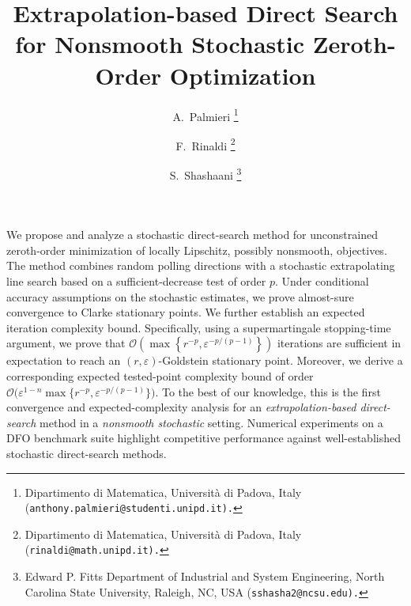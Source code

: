 \documentclass[11pt,a4paper]{article}
\title{Extrapolation-based Direct Search for Nonsmooth Stochastic Zeroth-Order Optimization}
\author{
    A.~Palmieri \thanks{Dipartimento di Matematica, Universit\`a
		di Padova, Italy
		(\tt{anthony.palmieri@studenti.unipd.it}).}
	\and
	F.~Rinaldi \thanks{Dipartimento di Matematica, Universit\`a
		di Padova, Italy
		(\tt{rinaldi@math.unipd.it}).}
    \and
    S.~Shashaani
    \thanks{Edward P. Fitts Department of Industrial and System Engineering, North Carolina State University, Raleigh, NC, USA
		(\tt{sshasha2@ncsu.edu}).}
}
\newcommand{\Dexp}{p}
\newcommand{\goldelta}{r}
\begin{document}
	\maketitle

We propose and analyze a stochastic direct-search method for unconstrained
zeroth-order minimization of locally Lipschitz, possibly nonsmooth, objectives.
The method combines random polling directions with a stochastic extrapolating
line search based on a sufficient-decrease test of order \(\Dexp\). Under
conditional accuracy assumptions on the stochastic estimates, 
we prove almost-sure convergence to Clarke
stationary points. We further establish an expected iteration complexity
bound. Specifically, using a supermartingale stopping-time argument, we prove
that
$\mathcal O\left(
        \max\left\{
            \goldelta^{-\Dexp},
            \varepsilon^{-\Dexp/(\Dexp-1)}
        \right\}
    \right)
$
iterations are sufficient in expectation to reach an
\((\goldelta,\varepsilon)\)-Goldstein stationary point. Moreover, we derive a corresponding expected tested-point complexity bound of order
\(\mathcal O\bigl(\varepsilon^{1-n}
\max\{r^{-p},\varepsilon^{-p/(p-1)}\}\bigr)\). To the best of
our knowledge, this is the first convergence and expected-complexity analysis
for an \emph{extrapolation-based direct-search} method in a \emph{nonsmooth
stochastic} setting. Numerical experiments on a DFO benchmark suite highlight competitive performance against well-established stochastic direct-search methods.

\end{document}
